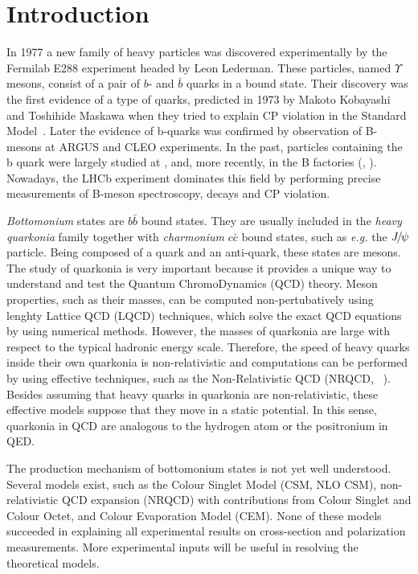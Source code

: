 \chapter{Introduction}
In 1977 a new family of heavy particles was discovered experimentally by the
Fermilab E288 experiment headed by Leon Lederman\cite{Herb:1977ek}. These
particles, named $\Upsilon$ mesons, consist of a pair of $b$- and
$\bar{b}$ quarks in a bound state. Their discovery was the first evidence of a type of
quarks, predicted in 1973 by Makoto Kobayashi and Toshihide Maskawa when they
tried to explain CP violation in the Standard Model~\cite{Kobayashi:1973fv}.
Later the evidence of b-quarks was confirmed by observation of B-mesons at
ARGUS\cite{Albrecht:1986nr} and CLEO\cite{Bebek:1987bp} experiments.
In the past, particles containing the b quark were largely studied at \lep, \tevatron and, 
more recently, in the B factories (\babar, \belle).
Nowadays, the LHCb experiment dominates this field by performing 
precise measurements of B-meson spectroscopy, decays and CP violation. 

{\em{Bottomonium}} states are $b\bar{b}$ bound states. They are usually included in the
{\em{heavy quarkonia}} family together with {\em{charmonium}} $c\bar{c}$ bound
states, such as {\em{e.g.}} the ${{J\mskip -3mu/\mskip -2mu\psi\mskip 2mu}}$ particle. Being composed of a quark and 
an anti-quark, these states are mesons. The
study of quarkonia is very important because it provides a unique way to
understand and test the Quantum ChromoDynamics (QCD) theory. Meson properties, 
such as their masses, can be computed non-pertubatively using lenghty
Lattice QCD (LQCD) techniques, which solve the exact QCD equations by using 
numerical methods. However, the masses of quarkonia are large with respect to 
the typical hadronic energy scale. Therefore, the speed of heavy quarks 
inside their own quarkonia is non-relativistic and computations can be performed 
by using effective techniques, such as the Non-Relativistic QCD
(NRQCD, ~\cite{Dowdall:2011iy,Dowdall:2012ab}).
Besides assuming that heavy quarks in quarkonia are non-relativistic, 
these effective models suppose that they move in a static
potential\cite{Kulshreshtha:1984mw,Parmar:2010ii,shah}. In this sense, quarkonia in QCD 
are analogous to the hydrogen atom or the positronium in QED. 

The production mechanism of bottomonium states is not yet well understood.
Several models exist, such as the Colour Singlet Model (CSM, NLO CSM),
non-relativistic QCD expansion (NRQCD) with contributions from Colour Singlet and 
Colour Octet, and Colour Evaporation Model (CEM). None of these models succeeded in
explaining all experimental results on cross-section and polarization measurements.
More experimental inputs will be useful in resolving the theoretical models.

